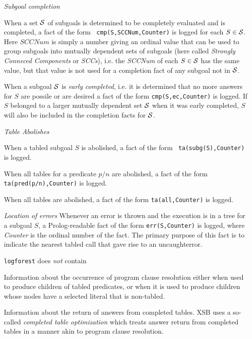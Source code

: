 \item {\em Subgoal completion}
\bi
\item When a set ${\cal S}$ of subgoals is determined to be completely
  evaluated and is completed, a fact of the form {\tt
    cmp(S,SCCNum,Counter)} is logged for each $S \in {\cal S}$.  Here
  $SCCNum$ is simply a number giving an ordinal value that can be used
  to group subgoals into mutually dependent sets of subgoals (here
  called {\em Strongly Conneced Components} or {\em SCCs}), i.e. the
  {\em SCCNum} of each $S \in {\cal S}$ has the same value, but that value
  is not used for a completion fact of any subgoal not in ${\cal S}$.
%
\item When a subgoal ${\cal S}$ is {\em early completed}, i.e. it is
  determined that no more answers for $S$ are possile or are desired a
  fact of the form {\tt cmp(S,ec,Counter)} is logged.  If $S$ belonged
  to a larger mutually dependent set ${\cal S}$ when it was early
  completed, $S$ will also be included in the completion facts for
  ${\cal S}$.
\ei
\item {\em Table Abolishes}
\bi
\item When a tabled subgoal $S$ is abolished, a fact of the form {\tt
  ta(subg(S),Counter)} is logged.
\item When all tables for a predicate $p/n$ are abolished, a fact of
  the form {\tt ta(pred(p/n),Counter)} is logged.
\item When all tables are abolished, a fact of the form {\tt ta(all,Counter)} is logged.
\ei
%
\item {\em Location of errors} Whenever an error is thrown and the
  execution is in a tree for a subgoal $S$, a Prolog-readable fact of
  the form {\tt err(S,Counter)} is logged, where {\em Counter} is the
  ordinal number of the fact.  The primary purpose of this fact is to
  indicate the nearest tabled call that gave rise to an uncaughterror.  \ei

{\tt logforest} does {\em not} contain

\bi
\item Information about the occurrence of program clause resolution
  either when used to produce children of tabled predicates, or when
  it is used to produce children whose nodes have a selected literal
  that is non-tabled.

\item Information about the return of answers from completed tables.
  XSB uses a so-called {\em completed table optimization} which treats
  answer return from completed tables in a manner akin to program
  clause resolution.  
 \ei

